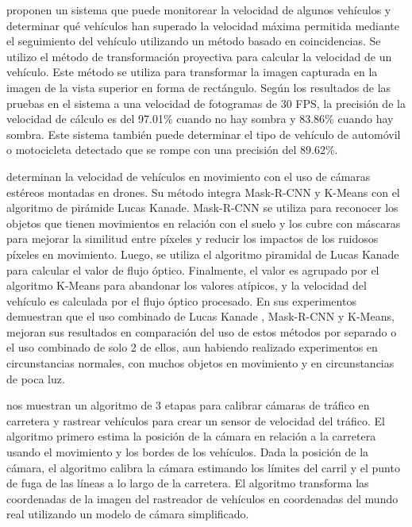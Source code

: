 \citeauthor{kurniawan2018Speed} proponen un sistema que puede monitorear la velocidad de algunos vehículos y determinar qué vehículos han superado la velocidad máxima permitida mediante el seguimiento del vehículo utilizando un método basado en coincidencias. Se utilizo el método de transformación proyectiva para calcular la velocidad de un vehículo. Este método se utiliza para transformar la imagen capturada en la imagen de la vista superior en forma de rectángulo. Según los resultados de las pruebas en el sistema a una velocidad de fotogramas de 30 FPS, la precisión de la velocidad de cálculo es del 97.01\% cuando no hay sombra y 83.86\% cuando hay sombra. Este sistema también puede determinar el tipo de vehículo de automóvil o motocicleta detectado que se rompe con una precisión del 89.62\%.


\citeauthor{peng2019Improved} determinan la velocidad de vehículos en movimiento con el uso de cámaras estéreos montadas en drones. Su método integra Mask-R-CNN  y K-Means con el algoritmo de pirámide Lucas Kanade. Mask-R-CNN se utiliza para reconocer los objetos que tienen movimientos en relación con el suelo y los cubre con máscaras para mejorar la similitud entre píxeles y reducir los impactos de los ruidosos píxeles en movimiento. Luego, se utiliza el algoritmo piramidal de Lucas Kanade para calcular el valor de flujo óptico. Finalmente, el valor es agrupado por el algoritmo K-Means para abandonar los valores atípicos, y la velocidad del vehículo es calculada por el flujo óptico procesado. En sus experimentos demuestran que el uso combinado de Lucas Kanade , Mask-R-CNN y K-Means, mejoran sus resultados en comparación del uso de estos métodos por separado o el uso combinado de solo 2 de ellos, aun habiendo realizado experimentos en circunstancias normales, con muchos objetos en movimiento y en circunstancias de poca luz.


\citeauthor{schoepflin2003Dynamic} nos muestran un algoritmo de 3 etapas para calibrar cámaras de tráfico en carretera y rastrear vehículos para crear un sensor de velocidad del tráfico. El algoritmo primero estima la posición de la cámara en relación a la carretera usando el movimiento y los bordes de los vehículos. Dada la posición de la cámara, el algoritmo calibra la cámara estimando los límites del carril y el punto de fuga de las líneas a lo largo de la carretera. El algoritmo transforma las coordenadas de la imagen del rastreador de vehículos en coordenadas del mundo real utilizando un modelo de cámara simplificado.


